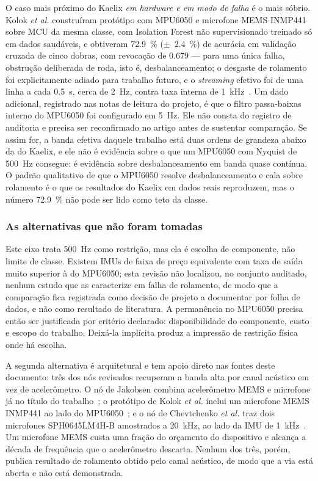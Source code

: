 \documentclass[11pt,a4paper]{article}
\begin{document}
O caso mais próximo do Kaelix \emph{em hardware e em modo de falha} é o mais sóbrio. Kolok
\emph{et al.} construíram protótipo com MPU6050 e microfone MEMS INMP441 sobre MCU da
mesma classe, com Isolation Forest não supervisionado treinado só em dados saudáveis, e
obtiveram \SI{72,9}{\percent} ($\pm$~\SI{2,4}{\percent}) de acurácia em validação cruzada
de cinco dobras, com revocação de \num{0,679} --- para uma única falha, obstrução
deliberada de roda, isto é, desbalanceamento; o desgaste de rolamento foi explicitamente
adiado para trabalho futuro, e o \textit{streaming} efetivo foi de uma linha a cada
\SI{0,5}{\second}, cerca de \SI{2}{\hertz}, contra taxa interna de
\SI{1}{\kilo\hertz}~\cite{kolok2025}. Um dado adicional, registrado nas notas de leitura
do projeto, é que o filtro passa-baixas interno do MPU6050 foi configurado em
\SI{5}{\hertz}. Ele não consta do registro de auditoria e precisa ser reconfirmado no
artigo antes de sustentar comparação. Se assim for, a banda efetiva daquele trabalho está
duas ordens de grandeza abaixo da do Kaelix, e ele não é evidência sobre o que um MPU6050
com Nyquist de \SI{500}{\hertz} consegue: é evidência sobre desbalanceamento em banda
quase contínua. O padrão qualitativo de que o MPU6050 resolve desbalanceamento e cala
sobre rolamento é o que os resultados do Kaelix em dados reais reproduzem, mas o número
\SI{72,9}{\percent} não pode ser lido como teto da classe.

\subsubsection{As alternativas que não foram tomadas}

Este eixo trata \SI{500}{\hertz} como restrição, mas ela é escolha de
componente, não limite de classe. Existem IMUs de faixa de preço equivalente com taxa de
saída muito superior à do MPU6050; esta revisão não localizou, no conjunto auditado,
nenhum estudo que as caracterize em falha de rolamento, de modo que a comparação fica
registrada como decisão de projeto a documentar por folha de dados, e não como
resultado de literatura. A permanência no MPU6050 precisa então ser justificada por
critério declarado: disponibilidade do componente, custo e escopo do trabalho. Deixá-la
implícita produz a impressão de restrição física onde há escolha.

A segunda alternativa é arquitetural e tem apoio direto nas fontes deste documento: três
dos nós revisados recuperam a banda alta por canal acústico em vez de acelerômetro. O nó
de Jakobsen combina acelerômetro MEMS e microfone já no título do
trabalho~\cite{jakobsen2024}; o protótipo de Kolok \emph{et al.} inclui um microfone
MEMS INMP441 ao lado do MPU6050~\cite{kolok2025}; e o nó de Chevtchenko \emph{et al.}
traz dois microfones SPH0645LM4H-B amostrados a \SI{20}{\kilo\hertz}, ao lado da IMU de
\SI{1}{\kilo\hertz}~\cite{chevtchenko2023}. Um microfone MEMS custa uma fração do
orçamento do dispositivo e alcança a década de frequência que o acelerômetro descarta.
Nenhum dos três, porém, publica resultado de rolamento obtido pelo canal acústico, de modo
que a via está aberta e não está demonstrada.
\end{document}
